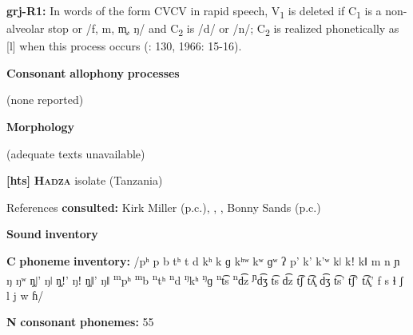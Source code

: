 \begin{styleBody}
\textbf{grj-R1:} In words of the form CVCV in rapid speech, V\textsubscript{1} is deleted if C\textsubscript{1} is a non-alveolar stop or /f, m, m̥, ŋ/ and C\textsubscript{2} is /d/ or /n/; C\textsubscript{2} is realized phonetically as [l] when this process occurs (\citealt{Innes1981}: 130, 1966: 15-16).
\end{styleBody}

\begin{styleBody}
\textbf{Consonant} \textbf{allophony} \textbf{processes}
\end{styleBody}

\begin{styleBody}
(none reported)
\end{styleBody}

\begin{styleBody}
\textbf{Morphology}
\end{styleBody}

\begin{styleBody}
(adequate texts unavailable)
\end{styleBody}

\begin{styleBody}
\textbf{[hts]}   \textbf{\textsc{Hadza}}  isolate (Tanzania)
\end{styleBody}

\begin{styleBody}
References \textbf{consulted:} Kirk Miller (p.c.), \citet{Sands2013}, \citet{SandsEtAl2012}, Bonny Sands (p.c.)
\end{styleBody}

\begin{styleBody}
\textbf{Sound} \textbf{inventory}
\end{styleBody}

\begin{styleBody}
\textbf{C} \textbf{phoneme} \textbf{inventory:} /pʰ p b tʰ t d kʰ k ɡ kʰʷ kʷ ɡʷ ʔ p’ k’ k’ʷ kǀ kǃ kǁ m n ɲ ŋ ŋʷ ŋ̥ǀ’ ŋǀ ŋ̥ǃ’ ŋǃ ŋ̥ǁ’ ŋǁ \textsuperscript{m}pʰ \textsuperscript{m}b \textsuperscript{n}tʰ \textsuperscript{n}d \textsuperscript{ŋ}kʰ \textsuperscript{ŋ}ɡ \textsuperscript{n}t͡s \textsuperscript{n}d͡z \textsuperscript{ɲ}d͡ʒ t͡s d͡z t͡ʃ t͡ʎ̥ d͡ʒ t͡s’ t͡ʃ’ t͡ʎ̥’ f s ɬ ʃ l j w ɦ/
\end{styleBody}

\begin{styleBody}
\textbf{N} \textbf{consonant} \textbf{phonemes:} 55
\end{styleBody}

